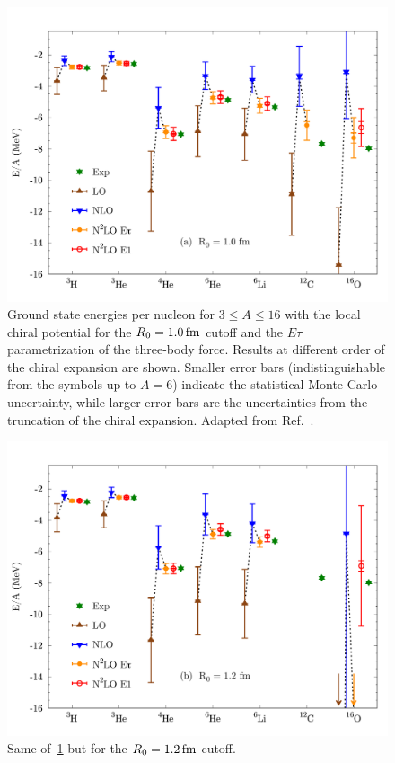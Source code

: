 \documentclass[aps,prc,twocolumn,superscriptaddress,showpacs,floatfix,nofootinbib]{revtex4-1}
\begin{document}
\begin{figure}[t]
\includegraphics[width=\linewidth]{ene_10.pdf}
\caption[]{Ground state energies per nucleon for $3\le A\le16$ with the local chiral potential 
for the $R_0=1.0\,\rm fm$ cutoff and the $E\tau$ parametrization of the three-body force. 
Results at different order of the chiral expansion are shown.
Smaller error bars (indistinguishable from the symbols up to $A=6$) 
indicate the statistical Monte Carlo uncertainty,
while larger error bars are the uncertainties from the truncation of
the chiral expansion. Adapted from Ref.~\cite{Lonardoni:2017afdmc}.}
\label{fig:ene_10}
\end{figure}

\begin{figure}[t]
\includegraphics[width=\linewidth]{ene_12.pdf}
\caption[]{Same of~\cref{fig:ene_10} but for the $R_0=1.2\,\rm fm$ cutoff.}
\label{fig:ene_12}
\end{figure}
\end{document}
